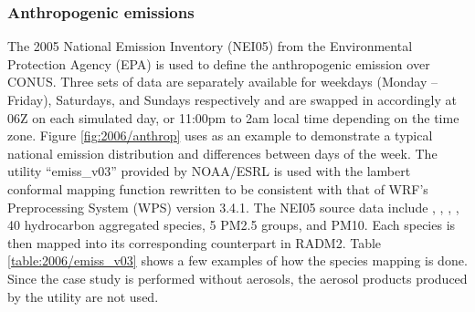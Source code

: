 	
	\subsubsection{Anthropogenic emissions}\label{sssec:2006/method/emiss/anthrop}

	The 2005 National Emission Inventory (NEI05) from the Environmental Protection Agency (EPA) is used to define the anthropogenic emission over CONUS. Three sets of data are separately available for weekdays (Monday -- Friday), Saturdays, and Sundays respectively and are swapped in accordingly at 06Z on each simulated day, or 11:00pm to 2am local time depending on the time zone. Figure \ref{fig:2006/anthrop} uses  as an example to demonstrate a typical national emission distribution and differences between days of the week. The utility ``emiss\_v03'' provided by NOAA/ESRL is used with the lambert conformal mapping function rewritten to be consistent with that of WRF's Preprocessing System (WPS) version 3.4.1. The NEI05 source data include , , , , 40 hydrocarbon aggregated species, 5 PM2.5 groups, and PM10. Each species is then mapped into its corresponding counterpart in RADM2. Table \ref{table:2006/emiss_v03} shows a few examples of how the species mapping is done. Since the case study is performed without aerosols, the aerosol products produced by the utility are not used.
	
